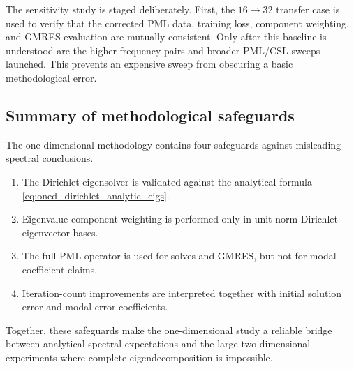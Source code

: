 The sensitivity study is staged deliberately. First, the $16\to32$ transfer
case is used to verify that the corrected PML data, training loss, component
weighting, and GMRES evaluation are mutually consistent. Only after this
baseline is understood are the higher frequency pairs and broader PML/CSL
sweeps launched. This prevents an expensive sweep from obscuring a basic
methodological error.


\subsection{Summary of methodological safeguards}
\label{subsec:methodology_1d_safeguards}

The one-dimensional methodology contains four safeguards against misleading
spectral conclusions.
\begin{enumerate}
    \item The Dirichlet eigensolver is validated against the analytical formula
    \eqref{eq:oned_dirichlet_analytic_eigs}.
    \item Eigenvalue component weighting is performed only in unit-norm
    Dirichlet eigenvector bases.
    \item The full PML operator is used for solves and GMRES, but not for
    modal coefficient claims.
    \item Iteration-count improvements are interpreted together with initial
    solution error and modal error coefficients.
\end{enumerate}
Together, these safeguards make the one-dimensional study a reliable bridge
between analytical spectral expectations and the large two-dimensional
experiments where complete eigendecomposition is impossible.

